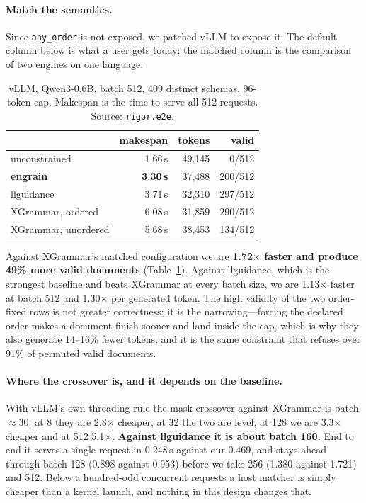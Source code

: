 \documentclass{article}
\begin{document}
\paragraph{Match the semantics.} Since \texttt{any\_order} is not exposed, we
patched vLLM to expose it. The default column below is what a user gets today;
the matched column is the comparison of two engines on one language.

\begin{table}[t]
\caption{vLLM, Qwen3-0.6B, batch 512, 409 distinct schemas, 96-token cap.
Makespan is the time to serve all 512 requests. Source: \texttt{rigor.e2e}.}
\label{tab:e2e}
\vskip 0.1in
\begin{center}
\begin{small}
\begin{tabular}{lrrr}
\toprule
 & makespan & tokens & valid \\
\midrule
unconstrained & 1.66\,s & 49{,}145 & 0/512 \\
\textbf{engrain} & \textbf{3.30\,s} & 37{,}488 & 200/512 \\
llguidance & 3.71\,s & 32{,}310 & 297/512 \\
XGrammar, ordered & 6.08\,s & 31{,}859 & 290/512 \\
XGrammar, unordered & 5.68\,s & 38{,}453 & 134/512 \\
\bottomrule
\end{tabular}
\end{small}
\end{center}
\vskip -0.1in
\end{table}

Against XGrammar's matched configuration we are \textbf{1.72$\times$ faster and
produce 49\% more valid documents} (Table~\ref{tab:e2e}). Against llguidance,
which is the strongest baseline and beats XGrammar at every batch size, we are
1.13$\times$ faster at batch 512 and 1.30$\times$ per generated token. The high
validity of the two order-fixed rows is not greater correctness; it is the
narrowing---forcing the declared order makes a document finish sooner and land
inside the cap, which is why they also generate 14--16\% fewer tokens, and it
is the same constraint that refuses over 91\% of permuted valid documents.

\paragraph{Where the crossover is, and it depends on the baseline.} With
vLLM's own threading rule the mask crossover against XGrammar is batch
$\approx$30: at 8 they are 2.8$\times$ cheaper, at 32 the two are level, at 128
we are 3.3$\times$ cheaper and at 512 5.1$\times$. \textbf{Against llguidance
it is about batch 160.} End to end it serves a single request in 0.248\,s
against our 0.469, and stays ahead through batch 128 (0.898 against 0.953)
before we take 256 (1.380 against 1.721) and 512. Below a hundred-odd
concurrent requests a host matcher is simply cheaper than a kernel launch, and
nothing in this design changes that.
\end{document}
